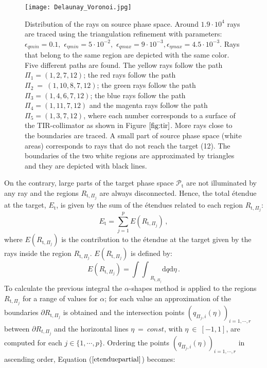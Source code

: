  \begin{figure}[h]
  \begin{center}
  \texttt{[image: Delaunay\_Voronoi.jpg]}
  \end{center}
  \caption{\footnotesize{Distribution of the rays on source phase space. Around $1.9 \cdot 10^4$ rays are traced using the triangulation refinement with parameters:
  $\epsilon_{q min} = 0.1 ,$ $ \epsilon_{\eta min} = 5\cdot 10^{-2}, $ $\epsilon_{q max} = 9\cdot 10^{-3}, \epsilon_{\eta max} = 4.5 \cdot 10^{-3}$. Rays that belong to the same region are depicted with the same color. Five different paths are found. The yellow rays follow the path $\Pi_1 = (1, 2, 7, 12)$;
   the red rays follow the path $\Pi_2 ~= ~(1, 10, 8, 7, 12)$; the green rays follow the path $\Pi_3 = (1, 4, 6, 7, 12)$;
   the blue rays follow the path $\Pi_4= (1, 11, 7, 12)$ and the magenta rays follow the path $\Pi_5= (1, 3, 7, 12)$,
   where each number corresponds to a surface of the TIR-collimator as shown in Figure $\ref{fig:tir}$.
  More rays close to the boundaries are traced. A small part of source phase space (white areas) corresponds to rays that do not reach the target (12). The boundaries of the two white regions are approximated by triangles and they are depicted with black lines.}}
  \label{fig:sourcePS}
\end{figure}
 On the contrary, large parts of the target phase space $\mathcal{P}_{\textrm{t}}$ are not illuminated by any ray and the regions $R_{\textrm{t}, \Pi_j}$ are always disconnected. Hence, the total \'{e}tendue at the target, $E_{\textrm{t}}$, is given by the sum of the \'{e}tendues related to each region $R_{\textrm{t}, \Pi_{j}}$:
 \begin{equation}
 \label{etenduetarget}
 E_{\textrm{t}} = \sum_{j = 1}^p E(R_{\textrm{t}, \Pi_j})\,,
 \end{equation}
 where $E(R_{\textrm{t}, \Pi_j})$ is the contribution to the \'{e}tendue at the target given by the rays inside the region $R_{\textrm{t}, \Pi_j}$. $E(R_{\textrm{t}, \Pi_j})$ is defined by:
  \begin{equation}\label{etenduepartial}
 E(R_{\textrm{t}, \Pi_j}) = {\int\!\!\int}_{R_{\textrm{t}, \Pi_j}} \textrm{d}q\textrm{d}\eta \,.
 \end{equation}
 To calculate the previous integral the $\alpha$-shapes method is applied to the regions
  $R_{\textrm{t},\Pi_j}$ for a range of values for $\alpha$;
   for each value an approximation of the boundaries $\partial R_{\textrm{t},\Pi_j}$ is obtained and
   the intersection points $(q_{\Pi_j,i}( \eta))_{i = 1, \cdots, r}$ between $\partial R_{t,\Pi_j}$
and the horizontal lines $\eta ~=~ const$, with $\eta~\in~[-1,1]$, are computed for each $j \in \{1, \cdots, p\}$.
Ordering the points $(q_{\Pi_j,i}( \eta))_{i = 1, \cdots, r}$ in ascending order,
 Equation ($\ref{etenduepartial}$) becomes:

